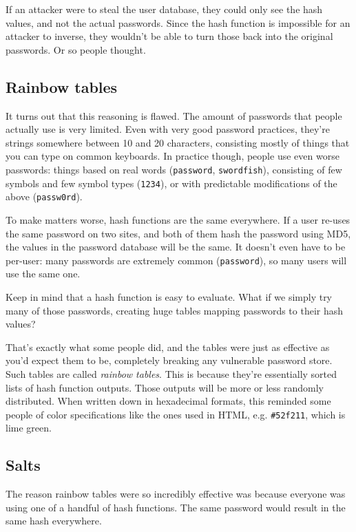 \documentclass[11pt,ebook,table,dvipsnames]{memoir}
\begin{document}
If an attacker were to steal the user database, they could only see
the hash values, and not the actual passwords. Since the hash function
is impossible for an attacker to inverse, they wouldn't be able to
turn those back into the original passwords. Or so people thought.
\subsection{Rainbow tables}
\label{sec-2-6-7-2}

It turns out that this reasoning is flawed. The amount of passwords
that people actually use is very limited. Even with very good
password practices, they're strings somewhere between 10 and 20
characters, consisting mostly of things that you can type on common
keyboards. In practice though, people use even worse passwords:
things based on real words (\texttt{password}, \texttt{swordfish}), consisting of
few symbols and few symbol types (\texttt{1234}), or with predictable
modifications of the above (\texttt{passw0rd}).

To make matters worse, hash functions are the same everywhere. If a
user re-uses the same password on two sites, and both of them hash the
password using MD5, the values in the password database will be the
same. It doesn't even have to be per-user: many passwords are
extremely common (\texttt{password}), so many users will use the same one.

Keep in mind that a hash function is easy to evaluate. What if we
simply try many of those passwords, creating huge tables mapping
passwords to their hash values?

That's exactly what some people did, and the tables were just as
effective as you'd expect them to be, completely breaking any
vulnerable password store. Such tables are called \emph{rainbow tables}.
This is because they're essentially sorted lists of hash function
outputs. Those outputs will be more or less randomly distributed. When
written down in hexadecimal formats, this reminded some people of
color specifications like the ones used in HTML, e.g. \texttt{\#52f211}, which
is lime green.
\subsection{Salts}
\label{sec-2-6-7-3}

The reason rainbow tables were so incredibly effective was because
everyone was using one of a handful of hash functions. The same
password would result in the same hash everywhere.
\end{document}
